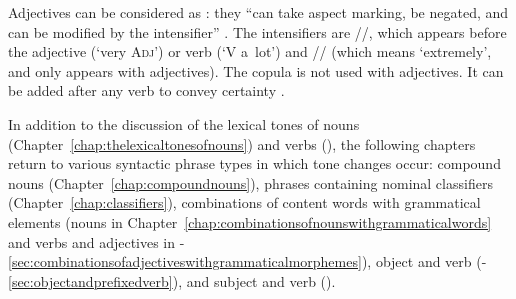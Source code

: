 Adjectives can be considered as : they “can take aspect marking, be negated, and can be modified by the intensifier” \citep[362]{lidz2010}. The intensifiers are //, which appears before the adjective (‘very \textsc{Adj}’) or verb (‘V a~lot’) and // (which means ‘extremely’, and only appears with adjectives). The {copula} is not used with adjectives. It can be added after any verb to convey certainty \citep[354]{lidz2010}.

In addition to the discussion of the lexical tones of nouns (Chapter~\ref{chap:thelexicaltonesofnouns}) and verbs (), the following chapters return to various syntactic phrase types in which tone changes occur: {compound} nouns (Chapter~\ref{chap:compoundnouns}), phrases containing nominal classifiers (Chapter~\ref{chap:classifiers}), combinations of content words with grammatical elements (nouns in Chapter~\ref{chap:combinationsofnounswithgrammaticalwords} and verbs and adjectives in -\ref{sec:combinationsofadjectiveswithgrammaticalmorphemes}), object and verb (-\ref{sec:objectandprefixedverb}), and subject and verb ().